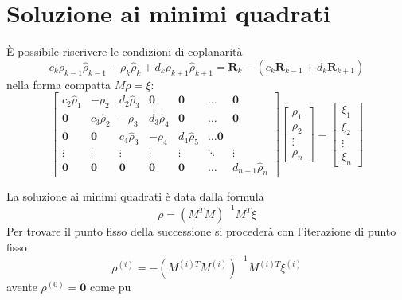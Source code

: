 \documentclass{beamer}
\begin{document}
\section{Soluzione ai minimi quadrati}
\begin{frame}
\`E possibile riscrivere le condizioni di coplanarit\`a \begin{equation}
c_k \rho_{k-1}\hat{\rho}_{k-1}-\rho_{k}\hat{\rho}_{k} +d_k \rho_{k+1}\hat{\rho}_{k+1}=\textbf{R}_k-(c_k\textbf{R}_{k-1}+d_k \textbf{R}_{k+1})
\end{equation}
nella forma compatta $M \rho =\xi$:
\begin{equation*}
\begin{bmatrix}
c_2 \hat{\rho}_1 & -\rho_2 & d_2 \hat{\rho}_3 & \mathbf{0} & \mathbf{0}  & \dots & \mathbf{0} \\
\mathbf{0} & c_3 \hat{\rho}_2 & -\rho_3 & d_3 \hat{\rho}_4 & \mathbf{0} & \dots &  \mathbf{0} \\
\mathbf{0} & \mathbf{0}  & c_4 \hat{\rho}_3 & -\rho_4 & d_4 \hat{\rho}_5 & \dots \mathbf{0} \\
\vdots & \vdots & \vdots & \vdots & \vdots & \ddots & \vdots \\
\mathbf{0}  & \mathbf{0}  & \mathbf{0}  & \mathbf{0}  & \mathbf{0}  & \dots & d_{n-1} \hat{\rho}_{n}
\end{bmatrix}
\begin{bmatrix}
\rho_1 \\
\rho_2 \\
\vdots \\
\rho_n
\end{bmatrix}=\begin{bmatrix}
\xi_1\\
\xi_2 \\
\vdots \\
\xi_n
\end{bmatrix}
\end{equation*}
\end{frame}
\begin{frame}[plain]
La soluzione ai minimi quadrati \`e data dalla formula \begin{equation}
 \rho= (M^T M)^{-1} M^T \xi
\end{equation}
Per trovare il punto fisso della successione si proceder\`a con l'iterazione di punto fisso \begin{equation}
 \rho^{(i)} = -(M^{(i)T} M^{(i)})^{-1} M^{(i)T} \xi^{(i)}
\end{equation}
avente $\rho^{(0)}=\textbf{0}$ come pu
\end{frame}
\end{document}
